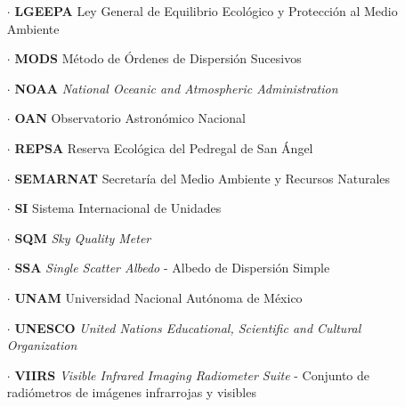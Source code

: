 \begin{itemize}
\item[$\cdot$] \textbf{LGEEPA} Ley General de Equilibrio Ecológico y Protección al Medio Ambiente

\item[$\cdot$] \textbf{MODS} Método de Órdenes de Dispersión Sucesivos

\item[$\cdot$] \textbf{NOAA} \textit{National Oceanic and Atmospheric Administration}

\item[$\cdot$] \textbf{OAN} Observatorio Astronómico Nacional

\item[$\cdot$] \textbf{REPSA} Reserva Ecológica del Pedregal de San Ángel

\item[$\cdot$] \textbf{SEMARNAT} Secretaría del Medio Ambiente y Recursos Naturales

\item[$\cdot$] \textbf{SI} Sistema Internacional de Unidades

\item[$\cdot$] \textbf{SQM} \textit{Sky Quality Meter}

\item[$\cdot$] \textbf{SSA} \textit{Single Scatter Albedo} - Albedo de Dispersión Simple


\item[$\cdot$] \textbf{UNAM} Universidad Nacional Autónoma de México

\item[$\cdot$] \textbf{UNESCO} \textit{United Nations Educational, Scientific and Cultural Organization}

\item[$\cdot$] \textbf{VIIRS} \textit{Visible Infrared Imaging Radiometer Suite} - Conjunto de radiómetros de imágenes infrarrojas y visibles
			
\end{itemize}